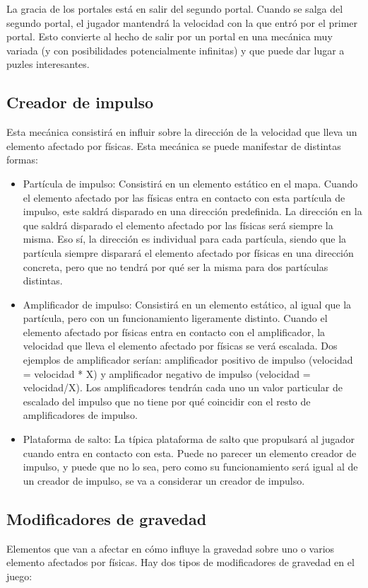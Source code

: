 La gracia de los portales está en salir del segundo portal. Cuando se salga del segundo portal, el jugador mantendrá la velocidad con la que entró por el primer portal. Esto convierte al hecho de salir por un portal en una mecánica muy variada (y con posibilidades potencialmente infinitas) y que puede dar lugar a puzles interesantes.

\subsection{Creador de impulso}
Esta mecánica consistirá en influir sobre la dirección de la velocidad que lleva un elemento afectado por físicas. Esta mecánica se puede manifestar de distintas formas:
\begin{itemize}
\item
Partícula de impulso: Consistirá en un elemento estático en el mapa. Cuando el elemento afectado por las físicas entra en contacto con esta partícula de impulso, este saldrá disparado en una dirección predefinida. La dirección en la que saldrá disparado el elemento afectado por las físicas será siempre la misma. Eso sí, la dirección es individual para cada partícula, siendo que la partícula siempre disparará el elemento afectado por físicas en una dirección concreta, pero que no tendrá por qué ser la misma para dos partículas distintas.
\item
Amplificador de impulso: Consistirá en un elemento estático, al igual que la partícula, pero con un funcionamiento ligeramente distinto. Cuando el elemento afectado por físicas entra en contacto con el amplificador, la velocidad que lleva el elemento afectado por físicas se verá escalada. Dos ejemplos de amplificador serían: amplificador positivo de impulso (velocidad = velocidad * X) y amplificador negativo de impulso (velocidad = velocidad/X). Los amplificadores tendrán cada uno un valor particular de escalado del impulso que no tiene por qué coincidir con el resto de amplificadores de impulso.
\item
Plataforma de salto: La típica plataforma de salto que propulsará al jugador cuando entra en contacto con esta. Puede no parecer un elemento creador de impulso, y puede que no lo sea, pero como su funcionamiento será igual al de un creador de impulso, se va a considerar un creador de impulso.
\end{itemize}

\subsection{Modificadores de gravedad}
Elementos que van a afectar en cómo influye la gravedad sobre uno o varios elemento afectados por físicas. Hay dos tipos de modificadores de gravedad en el juego:

